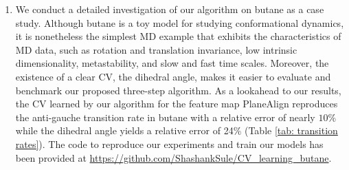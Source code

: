 \documentclass[reqno, 12pt]{article}
\begin{document}
\begin{enumerate}
        \item We conduct a detailed investigation of our algorithm on butane as a case study. Although butane is a toy model for studying conformational dynamics, it is nonetheless the simplest MD example that exhibits the characteristics of MD data, such as rotation and translation invariance, low intrinsic dimensionality, metastability, and slow and fast time scales. Moreover, the existence of a clear CV, the dihedral angle, makes it easier to evaluate and benchmark our proposed three-step algorithm. As a lookahead to our results, the CV learned by our algorithm for the feature map {\sf PlaneAlign} reproduces the anti-gauche transition rate in butane %
       with a relative error of nearly $10\%$ while the dihedral angle yields a relative error of 24\%
        (Table \eqref{tab: transition rates}). The code to reproduce our experiments and train our models has been provided at \url{https://github.com/ShashankSule/CV_learning_butane}. 
    \end{enumerate}

\end{document}
